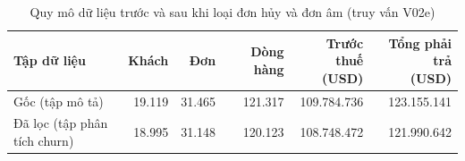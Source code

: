 \begin{table}[H]
\centering
\caption{Quy mô dữ liệu trước và sau khi loại đơn hủy và đơn âm (truy vấn V02e)}
\label{tab:before-after}
\footnotesize
\begin{tabularx}{\textwidth}{Xrrrrr}
\toprule
\rowcolor{tblhead} \textbf{Tập dữ liệu} & \textbf{Khách} & \textbf{Đơn} & \textbf{Dòng hàng} & \makecell[r]{\textbf{Trước thuế}\\\textbf{(USD)}} & \makecell[r]{\textbf{Tổng phải trả}\\\textbf{(USD)}} \\
\midrule
Gốc (tập mô tả) & 19.119 & 31.465 & 121.317 & 109.784.736 & 123.155.141 \\
Đã lọc (tập phân tích churn) & 18.995 & 31.148 & 120.123 & 108.748.472 & 121.990.642 \\
\bottomrule
\end{tabularx}
\end{table}
